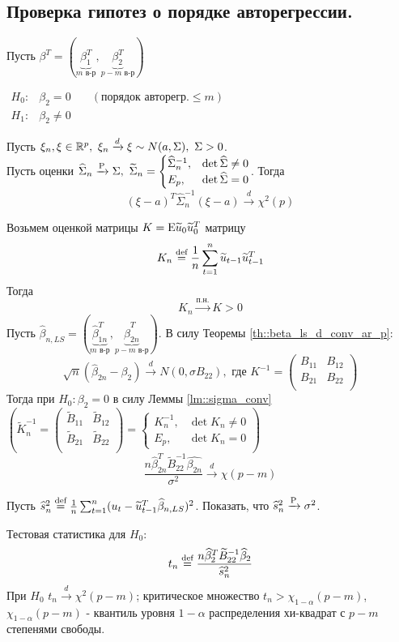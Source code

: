 \newpage
\subsection{Проверка гипотез о порядке авторегрессии.}
Пусть $\beta^T=(\underbrace{\beta_1^T}_{m\text{ в-р}},\underbrace{\beta_2^T}_{p-m\text{ в-р}})$

\(
\begin{array}{ccc}
    H_0:& \beta_2=0& \quad (\text{порядок авторегр.}\leq m)\\
    H_1:& \beta_2\neq0&
\end{array}
\)
\begin{lemma} \label{lm::sigma_conv}
    Пусть $\xi_n,\xi\in\R^p,\ \xi_n\xrightarrow{d}\xi\sim N(a,\Sigma),\ \Sigma>0$. \\
    Пусть оценки
    \(\widehat{\Sigma}_n\xrightarrow{\P}\Sigma,\ 
      \widetilde{\Sigma}_n=\begin{cases}
        \widehat{\Sigma}^{-1}_n,& \det\widehat{\Sigma}\neq0 \\
        E_p,& \det\widehat{\Sigma}=0
    \end{cases}\).
    Тогда
    \[(\xi-a)^T\widehat{\Sigma}^{-1}_n(\xi-a)\xrightarrow{d}\chi^2(p)\]
\end{lemma}

Возьмем оценкой матрицы $K=\E\widetilde{u}_0\widetilde{u}_0^T$ матрицу
\[K_n\defeq\frac{1}{n}\sum_{t=1}^n\widetilde{u}_{t-1}\widetilde{u}_{t-1}^T\]
Тогда
\[K_n\xrightarrow{\text{п.н.}}K>0\]
Пусть $\widehat{\beta}_{n,LS}=(\underbrace{\widehat{\beta}_{1n}^T}_{m\text{ в-р}}, \underbrace{\widehat{\beta}_{2n}^T}_{p-m\text{ в-р}})$.
В силу Теоремы \ref{th::beta_ls_d_conv_ar_p}:
\[\sqrt{n}(\widehat{\beta}_{2n}-\beta_2)\xrightarrow{d}N(0,\sigma B_{22}),\text{ где } K^{-1}=\begin{pmatrix}
    B_{11} & B_{12} \\
    B_{21} & B_{22} \\
\end{pmatrix}\]
Тогда при $H_0:\beta_2=0$ в силу Леммы \ref{lm::sigma_conv} $\left(\widetilde{K}_n^{-1}=\begin{pmatrix}
    \widetilde{B}_{11} & \widetilde{B}_{12} \\
    \widetilde{B}_{21} & \widetilde{B}_{22} \\
\end{pmatrix} = \begin{cases}
    K_n^{-1},& \det K_n\neq0\\
    E_p,& \det K_n=0    
\end{cases}\right)$
\[\frac{n\widehat{\beta}^T_{2n}\widetilde{B}_{22}^{-1}\widehat{\beta_{2n}}}{\sigma^2}\xrightarrow{d}\chi(p-m)\]
\begin{task}
    Пусть $\widehat{s}_n^2\defeq\frac{1}{n}\sum_{t=1}^n(u_t-\widetilde{u}_{t-1}^T\widehat{\beta}_{n,LS})^2$.
    Показать, что $\widehat{s}_n^2\xrightarrow{\P}\sigma^2$.
\end{task}
Тестовая статистика для $H_0$:
\[t_n\defeq\frac{n\widehat{\beta}^T_2\widetilde{B}_{22}^{-1}\widehat{\beta}_2}{\widehat{s}_n^2}\]
При $H_0$ $t_n\xrightarrow{d}\chi^2(p-m)$; критическое множество $t_n>\chi_{1-\alpha}(p-m)$, $\chi_{1-\alpha}(p-m)$ - квантиль уровня $1-\alpha$
распределения хи-квадрат с $p-m$ степенями свободы.

